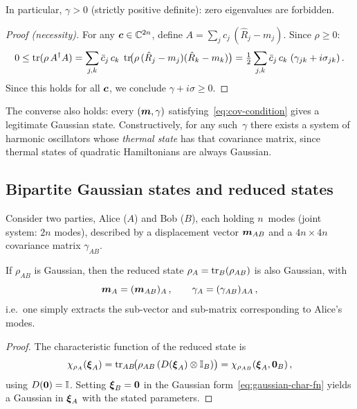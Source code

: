 In particular, $\gamma > 0$ (strictly positive definite): zero
eigenvalues are forbidden.

\begin{proof}[Proof (necessity)]
  For any $\boldsymbol{c} \in \mathbb{C}^{2n}$, define
  $A = \sum_j c_j\,(\hat{R}_j - m_j)$.  Since $\rho \geq 0$:
  \begin{equation}\label{eq:cov-proof}
    0 \leq \operatorname{tr}(\rho\, A^\dagger A)
    = \sum_{j,k} \bar{c}_j\, c_k\;
      \operatorname{tr}\!\bigl(\rho\,(\hat{R}_j - m_j)(\hat{R}_k - m_k)\bigr)
    = \tfrac{1}{2}\sum_{j,k} \bar{c}_j\, c_k\;
      (\gamma_{jk} + i\sigma_{jk})\,.
  \end{equation}
  Since this holds for all $\boldsymbol{c}$, we conclude
  $\gamma + i\sigma \geq 0$.
\end{proof}

\begin{remark}
  The converse also holds: every $(\boldsymbol{m}, \gamma)$
  satisfying~\eqref{eq:cov-condition} gives a legitimate Gaussian
  state.  Constructively, for any such~$\gamma$ there exists a system
  of harmonic oscillators whose \emph{thermal state} has that
  covariance matrix, since thermal states of quadratic Hamiltonians
  are always Gaussian.
\end{remark}

\subsection{Bipartite Gaussian states and reduced states}%
\label{sec:bipartite-gaussian}

Consider two parties, Alice ($A$) and Bob ($B$), each holding
$n$~modes (joint system: $2n$ modes), described by a displacement
vector $\boldsymbol{m}_{AB}$ and a $4n \times 4n$ covariance matrix
$\gamma_{AB}$.

\begin{proposition}%
\label{prop:reduced-gaussian}
  If $\rho_{AB}$ is Gaussian, then the reduced state
  $\rho_A = \operatorname{tr}_B(\rho_{AB})$ is also Gaussian, with
  \begin{equation}\label{eq:reduced-gaussian}
    \boldsymbol{m}_A = (\boldsymbol{m}_{AB})_A\,,\qquad
    \gamma_A = (\gamma_{AB})_{AA}\,,
  \end{equation}
  i.e.\ one simply extracts the sub-vector and sub-matrix
  corresponding to Alice's modes.
\end{proposition}

\begin{proof}
  The characteristic function of the reduced state is
  \[
    \chi_{\rho_A}(\boldsymbol{\xi}_A)
    = \operatorname{tr}_{AB}\!\bigl(\rho_{AB}\,
        (D(\boldsymbol{\xi}_A) \otimes \mathbb{I}_B)\bigr)
    = \chi_{\rho_{AB}}(\boldsymbol{\xi}_A, \boldsymbol{0}_B)\,,
  \]
  using $D(\boldsymbol{0}) = \mathbb{I}$.  Setting $\boldsymbol{\xi}_B = \boldsymbol{0}$ in the
  Gaussian form~\eqref{eq:gaussian-char-fn} yields a Gaussian in
  $\boldsymbol{\xi}_A$ with the stated parameters.
\end{proof}

